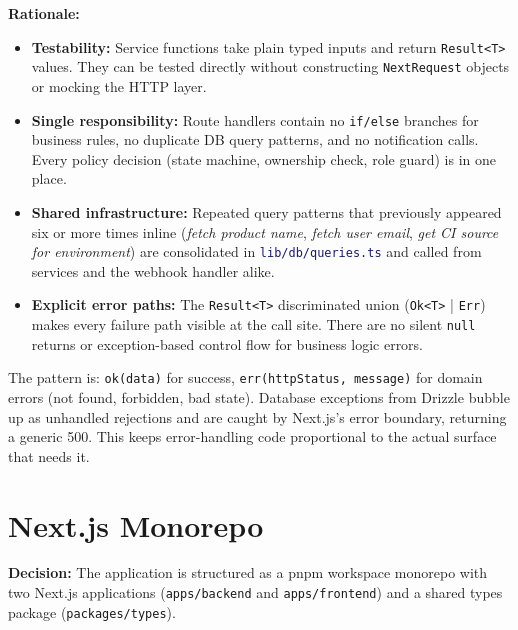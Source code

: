 \documentclass[12pt,a4paper,twoside]{report}
\newcommand{\code}[1]{\texttt{#1}}
\newcommand{\file}[1]{\texttt{\textcolor{MidnightBlue}{#1}}}
\begin{document}
\textbf{Rationale:}
\begin{itemize}
  \item \textbf{Testability:} Service functions take plain typed inputs and
        return \code{Result<T>} values. They can be tested directly without
        constructing \code{NextRequest} objects or mocking the HTTP layer.
  \item \textbf{Single responsibility:} Route handlers contain no
        \code{if/else} branches for business rules, no duplicate DB query
        patterns, and no notification calls. Every policy decision (state
        machine, ownership check, role guard) is in one place.
  \item \textbf{Shared infrastructure:} Repeated query patterns that
        previously appeared six or more times inline (\textit{fetch product
        name}, \textit{fetch user email}, \textit{get CI source for
        environment}) are consolidated in \file{lib/db/queries.ts} and
        called from services and the webhook handler alike.
  \item \textbf{Explicit error paths:} The \code{Result<T>} discriminated
        union (\code{Ok<T>} | \code{Err}) makes every failure path visible
        at the call site. There are no silent \code{null} returns or
        exception-based control flow for business logic errors.
\end{itemize}

The pattern is: \code{ok(data)} for success, \code{err(httpStatus, message)}
for domain errors (not found, forbidden, bad state). Database exceptions from
Drizzle bubble up as unhandled rejections and are caught by Next.js's error
boundary, returning a generic 500. This keeps error-handling code proportional
to the actual surface that needs it.

\section{Next.js Monorepo}

\textbf{Decision:} The application is structured as a pnpm workspace
monorepo with two Next.js applications (\code{apps/backend} and
\code{apps/frontend}) and a shared types package
(\code{packages/types}).
\end{document}

